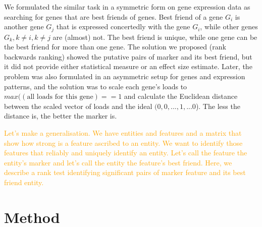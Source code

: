 \documentclass{llncs}
\begin{document}
We formulated \cite{best_friends:2015} the similar task in a symmetric form on gene expression data as searching for genes that are best friends of genes. Best friend of a gene $G_i$ is another gene $G_j$ that is expressed concertedly with the gene $G_i$, while other genes $G_k, k\neq i, k \neq j$ are (almost) not. The best friend is unique, while one gene can be the best friend for more than one gene. The solution we proposed (rank backwards ranking) showed the putative pairs of marker and its best friend, but it did not provide either statistical measure or an effect size estimate. Later, the problem was also formulated in an asymmetric setup \cite{patternmarkers:2017} for genes and expression patterns, and the solution was to scale each gene's loads to $max((\mbox{all loads for this gene})==1$ and calculate the Euclidean distance between the scaled vector of loads and the ideal $(0,0,...,1,...0$). The less the distance is, the better the marker is. 

\textcolor{orange}{Let's make a generalisation. We have entities and features and a matrix that show how strong is a feature ascribed to an entity. We want to identify those features that reliably and uniquely identify an entity. Let's call the feature the entity's marker and let's call the entity the feature's best friend. Here, we describe a rank test identifying significant pairs of marker feature and its best friend entity.}



%
\section{Method}



\end{document}
